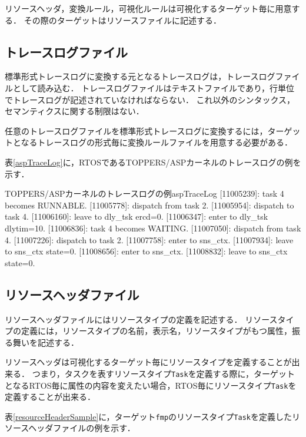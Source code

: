 リソースヘッダ，変換ルール，可視化ルールは可視化するターゲット毎に用意する．
その際のターゲットはリソースファイルに記述する．

\subsection{トレースログファイル}

標準形式トレースログに変換する元となるトレースログは，トレースログファイルとして読み込む．
トレースログファイルはテキストファイルであり，行単位でトレースログが記述されていなければならない．
これ以外のシンタックス，セマンティクスに関する制限はない．

任意のトレースログファイルを標準形式トレースログに変換するには，ターゲットとなるトレースログの形式毎に変換ルールファイルを用意する必要がある．

表\ref{aspTraceLog}に，RTOSであるTOPPERS/ASPカーネルのトレースログの例を示す．

\begin{File}{TOPPERS/ASPカーネルのトレースログの例}{aspTraceLog}
[11005239]: task 4 becomes RUNNABLE.
[11005778]: dispatch from task 2.
[11005954]: dispatch to task 4.
[11006160]: leave to dly_tsk ercd=0.
[11006347]: enter to dly_tsk dlytim=10.
[11006836]: task 4 becomes WAITING.
[11007050]: dispatch from task 4.
[11007226]: dispatch to task 2.
[11007758]: enter to sns_ctx.
[11007934]: leave to sns_ctx state=0.
[11008656]: enter to sns_ctx.
[11008832]: leave to sns_ctx state=0.
\end{File}

\subsection{リソースヘッダファイル}
\label{subsec:reshFile}

リソースヘッダファイルにはリソースタイプの定義を記述する．
リソースタイプの定義には，リソースタイプの名前，表示名，リソースタイプがもつ属性，振る舞いを記述する．

リソースヘッダは可視化するターゲット毎にリソースタイプを定義することが出来る．
つまり，タスクを表すリソースタイプ\verb|Task|を定義する際に，ターゲットとなるRTOS毎に属性の内容を変えたい場合，RTOS毎にリソースタイプ\verb|Task|を定義することが出来る．

表\ref{resourceHeaderSample}に，ターゲット\verb|fmp|のリソースタイプ\verb|Task|を定義したリソースヘッダファイルの例を示す．

